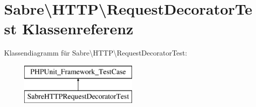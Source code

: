 \hypertarget{class_sabre_1_1_h_t_t_p_1_1_request_decorator_test}{}\section{Sabre\textbackslash{}H\+T\+TP\textbackslash{}Request\+Decorator\+Test Klassenreferenz}
\label{class_sabre_1_1_h_t_t_p_1_1_request_decorator_test}
Klassendiagramm für Sabre\textbackslash{}H\+T\+TP\textbackslash{}Request\+Decorator\+Test\+:\begin{figure}[H]
\begin{center}
\leavevmode
\includegraphics[height=2.000000cm]{class_sabre_1_1_h_t_t_p_1_1_request_decorator_test}
\end{center}
\end{figure}
